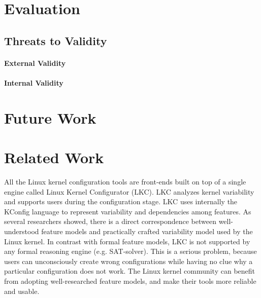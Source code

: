 \documentclass{chi2009}
\newcommand{\todo}[1]{\textsf{\textbf{\textcolor{Orange}{[[#1]]}}}}
\begin{document}



\section{Evaluation}\label{sec:evaluation}


\subsection{Threats to Validity}

\paragraph{External Validity}

\paragraph{Internal Validity}

\section{Future Work}\label{sec:futurework}



\section{Related Work}\label{sec:relatedwork}

All the Linux kernel configuration tools are front-ends built on top of a single engine called Linux Kernel Configurator (LKC). LKC analyzes kernel variability and supports users during the configuration stage. LKC uses internally the KConfig language to represent variability and dependencies among features. As several researchers \cite{sincero:lkc:2008,she:kernel:2010} showed, there is a direct correspondence between well-understood feature models and practically crafted variability model used by the Linux kernel. In contrast with formal feature models, LKC is not supported by any formal reasoning engine (e.g. SAT-solver). This is a serious problem, because users can unconsciously create wrong configurations while having no clue why a particular configuration does not work. The Linux kernel community can benefit from adopting well-researched feature models, and make their tools more reliable and usable.
\end{document}
